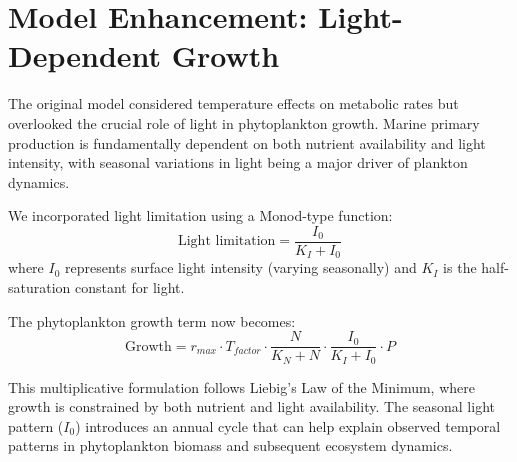 \section{Model Enhancement: Light-Dependent Growth}

The original model considered temperature effects on metabolic rates but overlooked the crucial role of light in phytoplankton growth. Marine primary production is fundamentally dependent on both nutrient availability and light intensity, with seasonal variations in light being a major driver of plankton dynamics.

We incorporated light limitation using a Monod-type function:
\[
\text{Light limitation} = \frac{I_0}{K_I + I_0}
\]
where $I_0$ represents surface light intensity (varying seasonally) and $K_I$ is the half-saturation constant for light.

The phytoplankton growth term now becomes:
\[
\text{Growth} = r_{max} \cdot T_{factor} \cdot \frac{N}{K_N + N} \cdot \frac{I_0}{K_I + I_0} \cdot P
\]

This multiplicative formulation follows Liebig's Law of the Minimum, where growth is constrained by both nutrient and light availability. The seasonal light pattern ($I_0$) introduces an annual cycle that can help explain observed temporal patterns in phytoplankton biomass and subsequent ecosystem dynamics.
